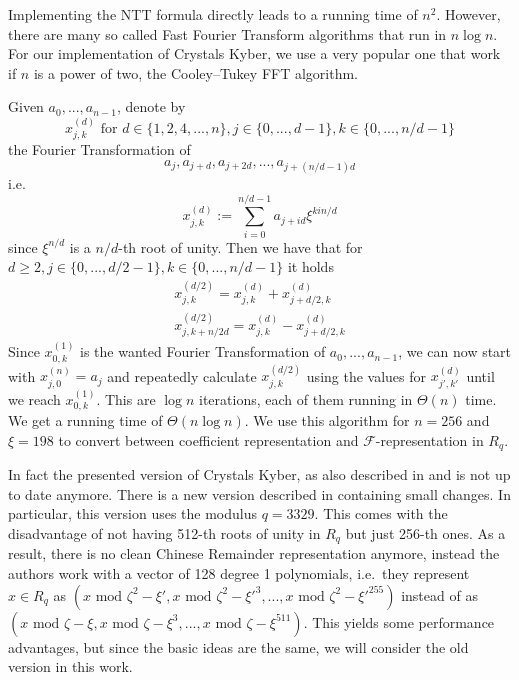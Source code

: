 \documentclass{report}
\renewcommand{\mod}{\text{ mod }}
\begin{document}
Implementing the NTT formula directly leads to a running time of $n^2$. However, there are many so called Fast Fourier Transform algorithms that run in $n\log n$. For our implementation of Crystals Kyber, we use a very popular one that work if $n$ is a power of two, the Cooley–Tukey FFT algorithm.

Given $a_0, ..., a_{n - 1}$, denote by 
\begin{equation}
x_{j, k}^{(d)} \text{ for } d \in \{ 1, 2, 4, ..., n \}, j \in \{ 0, ..., d - 1 \}, k \in \{ 0, ..., n/d - 1 \} \nonumber
\end{equation}
the Fourier Transformation of 
\begin{equation}
a_j, a_{j + d}, a_{j + 2d}, ..., a_{j + (n/d - 1)d} \nonumber
\end{equation}
i.e.
\begin{equation}
x_{j, k}^{(d)} := \sum_{i = 0}^{n/d - 1} a_{j + id} \xi^{kin/d} \nonumber
\end{equation}
since $\xi^{n/d}$ is a $n/d$-th root of unity. Then we have that for $d \geq 2, j \in \{ 0, ..., d/2 - 1 \}, k \in \{ 0, ..., n/d - 1 \}$ it holds
\begin{equation}
\begin{split}
x_{j, k}^{(d/2)} = x_{j, k}^{(d)} + x_{j + d/2, k}^{(d)} \\ 
x_{j, k + n/2d}^{(d/2)} = x_{j, k}^{(d)} - x_{j + d/2, k}^{(d)}
\end{split} \nonumber
\end{equation}
Since $x_{0, k}^{(1)}$ is the wanted Fourier Transformation of $a_0, ..., a_{n - 1}$, we can now start with $x_{j, 0}^{(n)} = a_j$ and repeatedly calculate $x_{j, k}^{(d/2)}$ using the values for $x_{j', k'}^{(d)}$ until we reach $x_{0, k}^{(1)}$. This are $\log n$ iterations, each of them running in $\Theta(n)$ time. We get a running time of $\Theta(n\log n)$.
We use this algorithm for $n = 256$ and $\xi = 198$ to convert between coefficient representation and $\mathcal{F}$-representation in $R_q$.

In fact the presented version of Crystals Kyber, as also described in \cite{Kyber} and \cite{NistirFstRound} is not up to date anymore. There is a new version described in \cite{NistirSndRound} containing small changes. In particular, this version uses the modulus $q = 3329$. This comes with the disadvantage of not having 512-th roots of unity in $R_q$ but just 256-th ones. As a result, there is no clean Chinese Remainder representation anymore, instead the authors work with a vector of 128 degree 1 polynomials, i.e.\ they represent $x \in R_q$ as $(x \mod \zeta^2-\xi', x \mod \zeta^2-\xi'^3, ..., x \mod \zeta^2-\xi'^{255})$ instead of as $(x \mod \zeta - \xi, x \mod \zeta - \xi^3, ..., x \mod \zeta - \xi^{511})$. This yields some performance advantages, but since the basic ideas are the same, we will consider the old version in this work.
\end{document}
